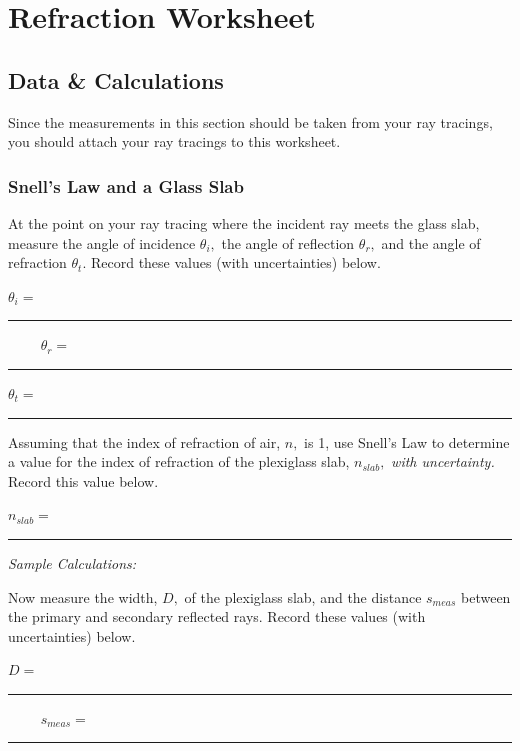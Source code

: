 \vfill
\pagebreak

\renewcommand{\thesection}{\thechapter.W}



\section{Refraction Worksheet}

\subsection{Data \& Calculations}

Since the measurements in this section should be taken from your ray tracings, you
should attach your ray tracings to this worksheet. 

\subsubsection{Snell's Law and a Glass Slab}

At the point on your ray tracing where the incident ray meets the glass slab, measure
the angle of incidence $\theta _i,$ the angle of reflection $\theta _r,$
and the angle of refraction $\theta _t.$ Record these values (with uncertainties)
below.

\begin{center}
$\theta _i=$~ \rule{3cm}{.1mm} ~~~~
$\theta _r=$~ \rule{3cm}{.1mm}

$\theta _t=$~ \rule{3cm}{.1mm}
\end{center} 
\vspace*{.5cm}

\noindent
Assuming that the index of refraction of air, $n,$ is 1, use Snell's Law to determine
a value for the index of refraction of the plexiglass slab, $n_{slab},$ {\it with
uncertainty.} Record this value below.

\begin{center}
$n_{slab}=$~ \rule{3cm}{.1mm} 
\end{center}
{\it Sample Calculations:}
\vspace*{3cm}

\newpage
\noindent
Now measure the width, $D,$ of the plexiglass slab, and the distance $s_{meas}$
between the primary and secondary reflected rays. Record these values (with
uncertainties) below.

\begin{center}
$D=$~ \rule{3cm}{.1mm} ~~~~
$s_{meas}=$~ \rule{3cm}{.1mm}
\end{center}

